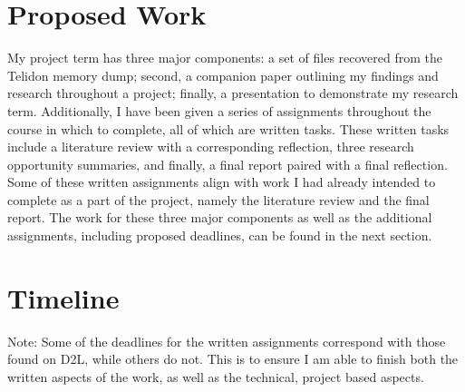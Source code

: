 \documentclass[sigconf]{acmart}
\begin{document}
\section{Proposed Work}

My project term has three major components: a set of files recovered from the Telidon memory dump; second, a companion paper outlining my findings and research throughout a project; finally, a presentation to demonstrate my research term. Additionally, I have been given a series of assignments throughout the course in which to complete, all of which are written tasks. These written tasks include a literature review with a corresponding reflection, three research opportunity summaries, and finally, a final report paired with a final reflection. Some of these written assignments align with work I had already intended to complete as a part of the project, namely the literature review and the final report. The work for these three major components as well as the additional assignments, including proposed deadlines, can be found in the next section.

\section{Timeline}

Note: Some of the deadlines for the written assignments correspond with those found on D2L, while others do not. This is to ensure I am able to finish both the written aspects of the work, as well as the technical, project based aspects. 
\end{document}

